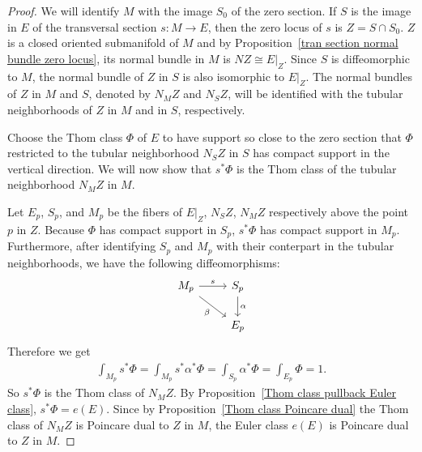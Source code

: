 \begin{proof}
We will identify $M$ with the image $S_0$ of the zero section. If $S$ is the image in $E$ of the transversal section $s:M\to E$, then the zero locus of $s$ is $Z=S\cap S_0$. 
$Z$ is a closed oriented submanifold of $M$ and by Proposition~\ref{tran section normal bundle zero locus}, its normal bundle in $M$ is $NZ\cong E|_Z$. Since $S$ is 
diffeomorphic to $M$, the normal bundle of $Z$ in $S$ is also isomorphic to $E|_Z$. The normal bundles of $Z$ in $M$ and $S$, denoted by $N_MZ$ and $N_SZ$, will be 
identified with the tubular neighborhoods of $Z$ in $M$ and in $S$, respectively.\par
Choose the Thom class $\Phi$ of $E$ to have support so close to the zero section that $\Phi$ restricted to the tubular neighborhood $N_SZ$ in $S$ has compact support 
in the vertical direction. We will now show that $s^*\Phi$ is the Thom class of the tubular neighborhood $N_MZ$ in $M$.\par
Let $E_p$, $S_p$, and $M_p$ be the fibers of $E|_Z$, $N_SZ$, $N_MZ$ respectively above the point $p$ in $Z$. Because $\Phi$ has compact support in $S_p$, $s^*\Phi$ 
has compact support in $M_p$. Furthermore, after identifying $S_p$ and $M_p$ with their conterpart in the tubular neighborhoods, we have the following diffeomorphisms:
\[\begin{tikzcd}
M_p\ar[rd,swap,"\beta"]\ar[r,"s"]&S_p\ar[d,"\alpha"]\\
&E_p
\end{tikzcd}\]
Therefore we get
\begin{align*}
\int_{M_p}s^*\Phi=\int_{M_p}s^*\alpha^*\Phi=\int_{S_p}\alpha^*\Phi=\int_{E_p}\Phi=1.
\end{align*}
So $s^*\Phi$ is the Thom class of $N_MZ$. By Proposition~\ref{Thom class pullback Euler class}, $s^*\Phi=e(E)$. Since by Proposition~\ref{Thom class Poincare dual} the 
Thom class of $N_MZ$ is Poincare dual to $Z$ in $M$, the Euler class $e(E)$ is Poincare dual to $Z$ in $M$.
\end{proof}
